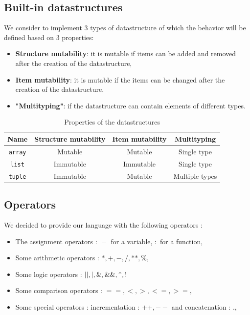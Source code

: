 \documentclass[a4paper,titlepage]{article}
\begin{document}
  \subsection{Built-in datastructures}

We consider to implement 3 types of datastructure of which the behavior will be defined based on 3 properties:
\begin{itemize}
  \item \textbf{Structure mutability}: it is mutable if items can be added and removed after the creation of the datastructure,
  \item \textbf{Item mutability}: it is mutable if the items can be changed after the creation of the datastructure,
  \item \textbf{"Multityping"}: if the datastructure can contain elements of different types. 
\end{itemize}

\begin{table}[h!]
  \center
  \begin{tabular}{c|ccc}
    Name & Structure mutability & Item mutability & Multityping\\
    \hline
    \texttt{array} & Mutable & Mutable & Single type\\
    \texttt{list} & Immutable & Immutable & Single type\\
    \texttt{tuple} & Immutable & Mutable & Multiple types
  \end{tabular}
  \caption{Properties of the datastructures}
\end{table}

  \subsection{Operators}
We decided to provide our language with the following operators :
\begin{itemize}
  \item The assignment operators : $ = $ for a variable, $ : $ for a function,
  \item Some arithmetic operators : $*, +, -, /, **, \%,$
  \item Some logic operators : $||, |, \&, \&\&, \verb+^+, !$
  \item Some comparison operators : $==, <, >, <=, >=,$
  \item Some special operators : incrementation : $++, --$ and concatenation : $.$, 
\end{itemize}


\newpage
\end{document}
